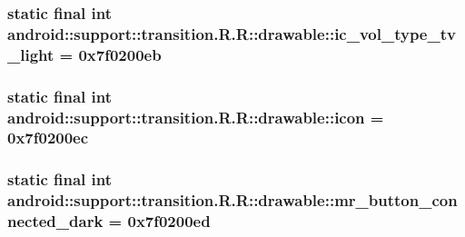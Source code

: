 \hypertarget{classandroid_1_1support_1_1transition_1_1_r_1_1drawable_8ad2373b06e0be5a08e879c6cd661acf}{
\subsubsection[{ic\_\-vol\_\-type\_\-tv\_\-light}]{\setlength{\rightskip}{0pt plus 5cm}static final int android::support::transition.R.R::drawable::ic\_\-vol\_\-type\_\-tv\_\-light = 0x7f0200eb}}
\label{classandroid_1_1support_1_1transition_1_1_r_1_1drawable_8ad2373b06e0be5a08e879c6cd661acf}


\hypertarget{classandroid_1_1support_1_1transition_1_1_r_1_1drawable_cdf69673e1aaf71fa12a4057f950026b}{
\subsubsection[{icon}]{\setlength{\rightskip}{0pt plus 5cm}static final int android::support::transition.R.R::drawable::icon = 0x7f0200ec}}
\label{classandroid_1_1support_1_1transition_1_1_r_1_1drawable_cdf69673e1aaf71fa12a4057f950026b}


\hypertarget{classandroid_1_1support_1_1transition_1_1_r_1_1drawable_66821ab4c368bb4d685124b69f06187d}{
\subsubsection[{mr\_\-button\_\-connected\_\-dark}]{\setlength{\rightskip}{0pt plus 5cm}static final int android::support::transition.R.R::drawable::mr\_\-button\_\-connected\_\-dark = 0x7f0200ed}}
\label{classandroid_1_1support_1_1transition_1_1_r_1_1drawable_66821ab4c368bb4d685124b69f06187d}


